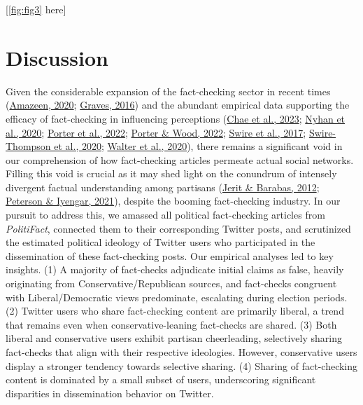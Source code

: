 \documentclass[
  12pt,
]{article}
\begin{document}
\begin{center}
[\autoref{fig:fig3} here]
\end{center}

\hypertarget{discussion}{%
\section{Discussion}\label{discussion}}

Given the considerable expansion of the fact-checking sector in recent
times (\protect\hyperlink{ref-amazeen2020journalistic}{Amazeen, 2020};
\protect\hyperlink{ref-graves2016}{Graves, 2016}) and the abundant
empirical data supporting the efficacy of fact-checking in influencing
perceptions (\protect\hyperlink{ref-chae2023perceiving}{Chae et al.,
2023}; \protect\hyperlink{ref-nyhan2020taking}{Nyhan et al., 2020};
\protect\hyperlink{ref-porter2022factual}{Porter et al., 2022};
\protect\hyperlink{ref-porter2022political}{Porter \& Wood, 2022};
\protect\hyperlink{ref-swire2017processing}{Swire et al., 2017};
\protect\hyperlink{ref-swire2020they}{Swire-Thompson et al., 2020};
\protect\hyperlink{ref-walter2020fact}{Walter et al., 2020}), there
remains a significant void in our comprehension of how fact-checking
articles permeate actual social networks. Filling this void is crucial
as it may shed light on the conundrum of intensely divergent factual
understanding among partisans
(\protect\hyperlink{ref-jerit2012partisan}{Jerit \& Barabas, 2012};
\protect\hyperlink{ref-peterson2021partisan}{Peterson \& Iyengar,
2021}), despite the booming fact-checking industry. In our pursuit to
address this, we amassed all political fact-checking articles from
\emph{PolitiFact}, connected them to their corresponding Twitter posts,
and scrutinized the estimated political ideology of Twitter users who
participated in the dissemination of these fact-checking posts. Our
empirical analyses led to key insights. (1) A majority of fact-checks
adjudicate initial claims as false, heavily originating from
Conservative/Republican sources, and fact-checks congruent with
Liberal/Democratic views predominate, escalating during election
periods. (2) Twitter users who share fact-checking content are primarily
liberal, a trend that remains even when conservative-leaning fact-checks
are shared. (3) Both liberal and conservative users exhibit partisan
cheerleading, selectively sharing fact-checks that align with their
respective ideologies. However, conservative users display a stronger
tendency towards selective sharing. (4) Sharing of fact-checking content
is dominated by a small subset of users, underscoring significant
disparities in dissemination behavior on Twitter.
\end{document}

